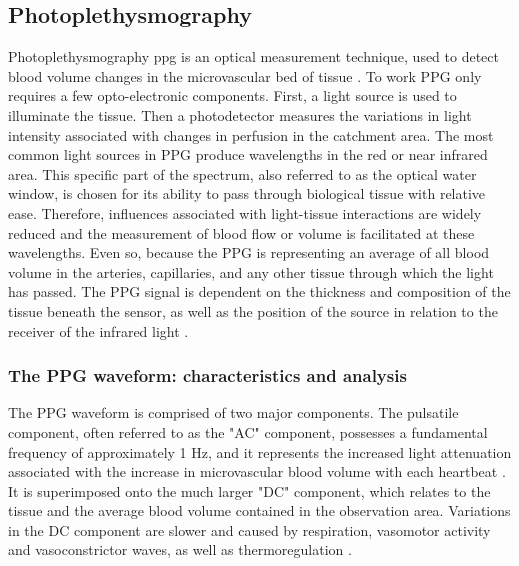 \subsection{Photoplethysmography}
Photoplethysmography \gls{ppg} is an optical measurement technique, used to detect blood volume changes in the microvascular bed of tissue \cite{Allan2007}. To work PPG only requires a few opto-electronic components. First, a light source is used to illuminate the tissue. Then a photodetector measures the variations in light intensity associated with changes in perfusion in the catchment area. 
The most common light sources in PPG produce wavelengths in the red or near infrared area. This specific part of the spectrum, also referred to as the optical water window, is chosen for its ability to pass through biological tissue with relative ease. Therefore, influences associated with light-tissue interactions are widely reduced and the measurement of blood flow or volume is facilitated at these wavelengths.
Even so, because the PPG is representing an average of all blood volume in the arteries, capillaries, and any other tissue through which the light has passed. The
PPG signal is dependent on the thickness and composition of the tissue beneath the sensor, as well as the position of the source in relation to the receiver of the infrared light \cite{Peper2007}.\\

\subsubsection{The PPG waveform: characteristics and analysis} 
The PPG waveform is comprised of two major components. The pulsatile component, often referred to as the "AC" component, possesses a fundamental frequency of approximately 1 Hz, and it represents the increased light attenuation associated with the increase in microvascular blood volume with each heartbeat \cite{Allan2007}. It is superimposed onto the much larger "DC" component, which relates to the tissue and the average blood volume contained in the observation area. Variations in the DC component are slower and caused by respiration, vasomotor activity and vasoconstrictor waves, as well as thermoregulation \cite{Allan2007}.\\ 

